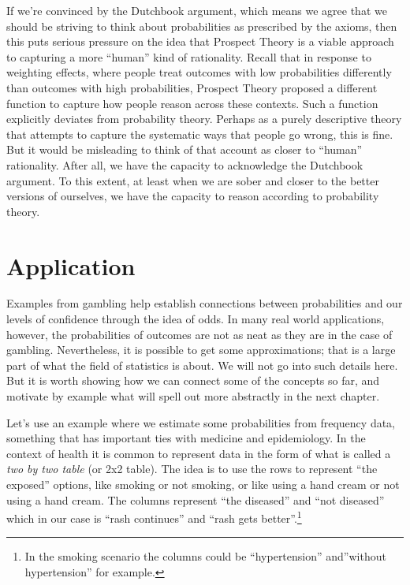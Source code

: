 \documentclass[]{tufte-book}
\begin{document}
If we're convinced by the Dutchbook argument, which means we agree that we should be striving to think about probabilities as prescribed by the axioms, then this puts serious pressure on the idea that Prospect Theory is a viable approach to capturing a more ``human'' kind of rationality. Recall that in response to weighting effects, where people treat outcomes with low probabilities differently than outcomes with high probabilities, Prospect Theory proposed a different function to capture how people reason across these contexts. Such a function explicitly deviates from probability theory. Perhaps as a purely descriptive theory that attempts to capture the systematic ways that people go wrong, this is fine. But it would be misleading to think of that account as closer to ``human'' rationality. After all, we have the capacity to acknowledge the Dutchbook argument. To this extent, at least when we are sober and closer to the better versions of ourselves, we have the capacity to reason according to probability theory.

\hypertarget{application}{%
\section{Application}\label{application}}

Examples from gambling help establish connections between probabilities and our levels of confidence through the idea of odds. In many real world applications, however, the probabilities of outcomes are not as neat as they are in the case of gambling. Nevertheless, it is possible to get some approximations; that is a large part of what the field of statistics is about. We will not go into such details here. But it is worth showing how we can connect some of the concepts so far, and motivate by example what will spell out more abstractly in the next chapter.

Let's use an example where we estimate some probabilities from frequency data, something that has important ties with medicine and epidemiology. In the context of health it is common to represent data in the form of what is called a \emph{two by two table} (or 2x2 table). The idea is to use the rows to represent ``the exposed'' options, like smoking or not smoking, or like using a hand cream or not using a hand cream. The columns represent ``the diseased'' and ``not diseased'' which in our case is ``rash continues'' and ``rash gets better''.\footnote{In the smoking scenario the columns could be ``hypertension'' and''without hypertension'' for example.}
\end{document}
